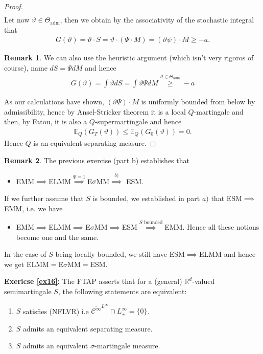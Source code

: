 \documentclass[12pt,a4paper, twoside]{article}
\theoremstyle{definition}
\newtheorem{rem}{Remark}[section]
\newcommand{\EE}{\mathbb{E}} %
\begin{document}
\begin{proof}
\begin{align*}
\end{align*}
Let now $\vartheta \in \Theta_\text{adm}$, then we obtain by the associativity of the stochastic integral that
\begin{align*}
G( \vartheta) = \vartheta \cdot S = \vartheta \cdot (\Psi \cdot M)= ( \vartheta \psi) \cdot M  \geq -a.
\end{align*}
\begin{rem} We can also use the heuristic argument (which isn't very rigoros of course), name $dS= \Psi dM$ and hence 
\begin{align*}
G( \vartheta) = \int \vartheta dS = \int \vartheta \Psi dM \overset{ \vartheta \in \Theta_\text{adm}} \geq -a
\end{align*}
\end{rem}
As our calculations have shown, $( \vartheta \Psi) \cdot M$ is uniformly bounded from below by admissibility, hence by Ansel-Stricker theorem it is a local $Q$-martingale and then,  by Fatou, it is also a $Q$-supermartingale and hence
\begin{align*}
\EE_Q(G_T( \vartheta)) \leq \EE_Q( G_0( \vartheta)) =0.
\end{align*}
Hence $Q$ is an equivalent separating measure. 
\end{proof}
\begin{rem} The previous exercise (part b) establishes that 
\begin{itemize}
\item EMM$\implies$ELMM$\overset{ \Psi=1}\implies$E$\sigma$MM$\overset{b)}\implies$ ESM.
\end{itemize}
If we further assume that $S$ is bounded, we established in part $a)$ that ESM$\implies$ EMM, i.e. we have
\begin{itemize}
\item EMM$\implies$ELMM$\implies $E$\sigma$MM$\implies$ESM$\overset{S \text{ bounded}}\implies$EMM. Hence all these notions become one and the same. 
\end{itemize}
In the case of $S$ being locally bounded, we still have ESM$\implies$ELMM and hence we get ELMM$=$E$\sigma$MM$=$ESM.
\end{rem}
\newpage
\noindent \textbf{Exericse \ref{ex16}:} The FTAP asserts that for a (general) $\mathbb{R}^d$-valued semimartingale $S$, the following statements are equivalent:
\begin{enumerate}
\item $S$ satisfies (NFLVR) i.e $\overline{\mathcal{C}^\infty}^{L^\infty} \cap L_+^\infty =\{0\}$.
\item $S$ admits an equivalent separating measure.
\item $S$ admits an equivalent $\sigma$-martingale measure. 
\end{enumerate}
\end{document}
